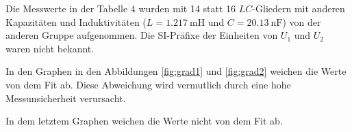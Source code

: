 Die Messwerte in der Tabelle 4 wurden mit 14 statt 16 $LC$-Gliedern mit anderen Kapazitäten und Induktivitäten ($L = \SI{1.217}{\milli\henry}$ und $C = \SI{20.13}{\nano\farad}$) von der anderen Gruppe aufgenommen.
Die SI-Präfixe der Einheiten von $U_1$ und $U_2$ waren nicht bekannt.

In den Graphen in den Abbildungen \ref{fig:grad1} und \ref{fig:grad2} weichen die Werte von dem Fit ab. Diese Abweichung wird vermutlich durch eine hohe Messunsicherheit verursacht.

In dem letztem Graphen weichen die Werte nicht von dem Fit ab.







	

